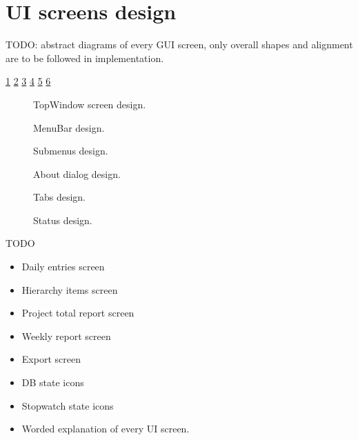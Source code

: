 \section{UI screens design}
TODO: abstract diagrams of every GUI screen, only overall shapes and alignment
are to be followed in implementation.

\cref{fig:topwindow_screen}
\cref{fig:menubar_design}
\cref{fig:submenus_design}
\cref{fig:about_design}
\cref{fig:tabs_design}
\cref{fig:status_design}

\begin{figure}
  
  \caption{\label{fig:topwindow_screen} TopWindow screen design.}
\end{figure}

\begin{figure}
  
  \caption{\label{fig:menubar_design} MenuBar design.}
\end{figure}

\begin{figure}
  
  \caption{\label{fig:submenus_design} Submenus design.}
\end{figure}

\begin{figure}
  
  \caption{\label{fig:about_design} About dialog design.}
\end{figure}

\begin{figure}
  
  \caption{\label{fig:tabs_design} Tabs design.}
\end{figure}

\begin{figure}
  
  \caption{\label{fig:status_design} Status design.}
\end{figure}

TODO
\begin{itemize}
\item Daily entries screen
\item Hierarchy items screen
\item Project total report screen
\item Weekly report screen
\item Export screen
\item DB state icons
\item Stopwatch state icons
\item Worded explanation of every UI screen.
\end{itemize}